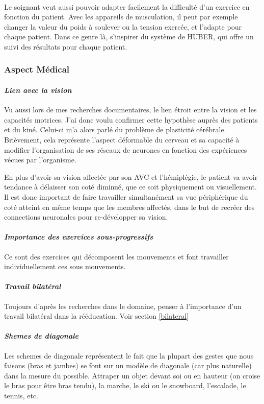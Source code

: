 \paragraph{}Le soignant veut aussi pouvoir adapter facilement la difficulté d'un exercice en fonction du patient. Avec les appareils de musculation, il peut par exemple changer la valeur du poids à soulever ou la tension exercée, et l'adapte pour chaque patient.
Dans ce genre là, s'inspirer du système de HUBER, qui offre un suivi des résultats pour chaque patient.

	\subsubsection*{Aspect Médical}

		\paragraph{\emph{Lien avec la vision}\\}
Vu aussi lors de mes recherches documentaires, le lien étroit entre la vision et les capacités motrices. J'ai donc voulu confirmer cette hypothèse auprès des patients et du kiné. Celui-ci m'a alors parlé du problème de plasticité cérébrale. Brièvement, cela représente l'aspect déformable du cerveau et sa capacité à modifier l'organisation de ses réseaux de neurones en fonction des expériences vécues par l'organisme. 

En plus d'avoir sa vision affectée par son AVC et l'hémiplégie, le patient va avoir tendance à délaisser son coté diminué, que ce soit physiquement ou visuellement. Il est donc important de faire travailler simultanément sa vue périphérique du coté atteint en même temps que les membres affectés, dans le but de recréer des connections neuronales pour re-développer sa vision.

		\paragraph{\emph{Importance des exercices sous-progressifs}\\}
Ce sont des exercices qui décomposent les mouvements et font travailler individuellement ces sous mouvements.

		\paragraph{\emph{Travail bilatéral}\\}
Toujours d'après les recherches dans le domaine, penser à l'importance d'un travail bilatéral dans la rééducation. Voir section \ref{bilateral}


		\paragraph{\emph{Shemes de diagonale}\\}
Les schemes de diagonale représentent le fait que la plupart des gestes que nous faisons (bras et jambes) se font sur un modèle de diagonale (car plus naturelle) dans la mesure du possible. Attraper un objet devant soi ou en hauteur (on croise le bras pour être bras tendu), la marche, le ski ou le snowboard, l'escalade, le tennis, etc.	
	
